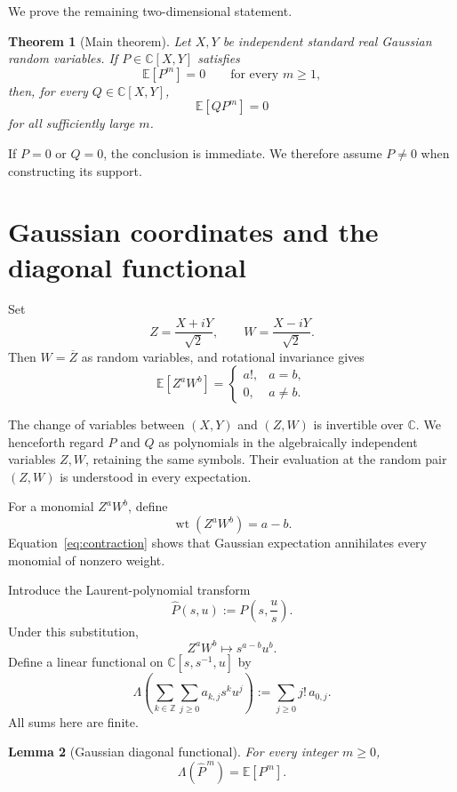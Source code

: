 \documentclass[11pt]{article}
\newtheorem{theorem}{Theorem}[section]
\newtheorem{lemma}[theorem]{Lemma}
\theoremstyle{remark}
\newcommand{\E}{\mathbb E}
\newcommand{\C}{\mathbb C}
\newcommand{\Z}{\mathbb Z}
\newcommand{\wt}{\operatorname{wt}}
\begin{document}
We prove the remaining two-dimensional statement.

\begin{theorem}[Main theorem]\label{thm:main}
Let $X,Y$ be independent standard real Gaussian random variables. If $P\in\C[X,Y]$ satisfies
\[
\E[P^m]=0
\qquad
\text{for every }m\ge1,
\]
then, for every $Q\in\C[X,Y]$,
\[
\E[QP^m]=0
\]
for all sufficiently large $m$.
\end{theorem}

If $P=0$ or $Q=0$, the conclusion is immediate. We therefore assume $P\ne0$ when constructing its support.

\section{Gaussian coordinates and the diagonal functional}

Set
\[
Z=\frac{X+iY}{\sqrt2},
\qquad
W=\frac{X-iY}{\sqrt2}.
\]
Then $W=\overline Z$ as random variables, and rotational invariance gives
\begin{equation}\label{eq:contraction}
\E[Z^aW^b]
=
\begin{cases}
a!,&a=b,\\
0,&a\ne b.
\end{cases}
\end{equation}

The change of variables between $(X,Y)$ and $(Z,W)$ is invertible over $\C$. We henceforth regard $P$ and $Q$ as polynomials in the algebraically independent variables $Z,W$, retaining the same symbols. Their evaluation at the random pair $(Z,W)$ is understood in every expectation.

For a monomial $Z^aW^b$, define
\[
\wt(Z^aW^b)=a-b.
\]
Equation~\eqref{eq:contraction} shows that Gaussian expectation annihilates every monomial of nonzero weight.

Introduce the Laurent-polynomial transform
\begin{equation}\label{eq:hatP}
\widehat P(s,u)
:=
P\!\left(s,\frac us\right).
\end{equation}
Under this substitution,
\[
Z^aW^b\longmapsto s^{a-b}u^b.
\]
Define a linear functional on $\C[s,s^{-1},u]$ by
\begin{equation}\label{eq:Lambda}
\Lambda\!\left(\sum_{k\in\Z}\sum_{j\ge0}a_{k,j}s^ku^j\right)
:=
\sum_{j\ge0}j!\,a_{0,j}.
\end{equation}
All sums here are finite.

\begin{lemma}[Gaussian diagonal functional]\label{lem:diagonal}
For every integer $m\ge0$,
\[
\Lambda(\widehat P^{\,m})=\E[P^m].
\]
\end{lemma}
\end{document}
